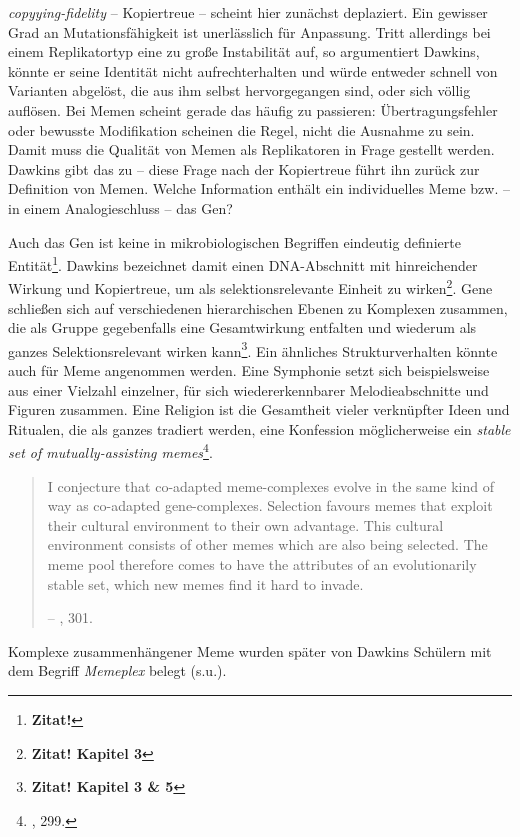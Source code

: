 \documentclass[openany,twoside,twocolumn]{book}
\let\rmarkdownfootnote\footnote%
\def\footnote{\protect\rmarkdownfootnote}
\begin{document}
\emph{copyying-fidelity} -- Kopiertreue -- scheint hier zunächst
deplaziert. Ein gewisser Grad an Mutationsfähigkeit ist unerlässlich für
Anpassung. Tritt allerdings bei einem Replikatortyp eine zu große
Instabilität auf, so argumentiert Dawkins, könnte er seine Identität
nicht aufrechterhalten und würde entweder schnell von Varianten
abgelöst, die aus ihm selbst hervorgegangen sind, oder sich völlig
auflösen. Bei Memen scheint gerade das häufig zu passieren:
Übertragungsfehler oder bewusste Modifikation scheinen die Regel, nicht
die Ausnahme zu sein. Damit muss die Qualität von Memen als Replikatoren
in Frage gestellt werden. Dawkins gibt das zu -- diese Frage nach der
Kopiertreue führt ihn zurück zur Definition von Memen. Welche
Information enthält ein individuelles Meme bzw. -- in einem
Analogieschluss -- das Gen?

Auch das Gen ist keine in mikrobiologischen Begriffen eindeutig
definierte Entität\footnote{\textbf{Zitat!}}. Dawkins bezeichnet damit
einen DNA-Abschnitt mit hinreichender Wirkung und Kopiertreue, um als
selektionsrelevante Einheit zu wirken\footnote{\textbf{Zitat! Kapitel 3}}.
Gene schließen sich auf verschiedenen hierarchischen Ebenen zu Komplexen
zusammen, die als Gruppe gegebenfalls eine Gesamtwirkung entfalten und
wiederum als ganzes Selektionsrelevant wirken kann\footnote{\textbf{Zitat!
  Kapitel 3 \& 5}}. Ein ähnliches Strukturverhalten könnte auch für Meme
angenommen werden. Eine Symphonie setzt sich beispielsweise aus einer
Vielzahl einzelner, für sich wiedererkennbarer Melodieabschnitte und
Figuren zusammen. Eine Religion ist die Gesamtheit vieler verknüpfter
Ideen und Ritualen, die als ganzes tradiert werden, eine Konfession
möglicherweise ein \emph{stable set of mutually-assisting
memes}\footnote{\textcite{Dawkinsselfishgene40th2016}, 299.}.

\begin{quote}
I conjecture that co-adapted meme-complexes evolve in the same kind of
way as co-adapted gene-complexes. Selection favours memes that exploit
their cultural environment to their own advantage. This cultural
environment consists of other memes which are also being selected. The
meme pool therefore comes to have the attributes of an evolutionarily
stable set, which new memes find it hard to invade.

-- \textcite{Dawkinsselfishgene40th2016}, 301.
\end{quote}

Komplexe zusammenhängener Meme wurden später von Dawkins Schülern mit
dem Begriff \emph{Memeplex} belegt (s.u.).
\end{document}
